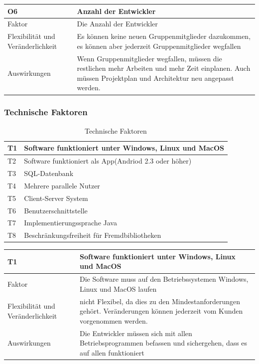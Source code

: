 \documentclass[fontsize=12pt,paper=a4,twoside]{scrartcl}
\begin{document}
\begin{table}[H]
\begin{tabular}{|p{3cm}|p{12cm}|}\hline
O6 & Anzahl der Entwickler\\ \hline
Faktor & Die Anzahl der Entwickler\\ \hline
Flexibilität und Veränderlichkeit & Es können keine neuen Gruppenmitglieder dazukommen, es können aber jederzeit Gruppenmitglieder wegfallen \\ \hline
Auswirkungen & Wenn Gruppenmitglieder wegfallen, müssen die restlichen mehr Arbeiten und mehr Zeit einplanen. Auch müssen Projektplan und Architektur neu angepasst werden.\\ \hline
\end{tabular}
\end{table}

\subsubsection{Technische Faktoren}
\label{sec:techfaktoren}

\begin{table}[H]
\centering
\caption{Technische Faktoren}
\begin{tabular}{|l|l|} \hline
T1 & Software funktioniert unter Windows, Linux und MacOS \\ \hline
T2 & Software funktioniert als App(Andriod 2.3 oder höher) \\ \hline
T3 & SQL-Datenbank \\ \hline
T4 & Mehrere parallele Nutzer \\ \hline
T5 & Client-Server System \\ \hline
T6 & Benutzerschnittstelle \\ \hline
T7 & Implementierungssprache Java \\ \hline
T8 &  Beschränkungsfreiheit für Fremdbibliotheken\\ \hline
\end{tabular}
\end{table}

\begin{table}[H]
\begin{tabular}{|p{3cm}|p{12cm}|}\hline
T1 & Software funktioniert unter Windows, Linux und MacOS \\ \hline
Faktor & Die Software muss auf den Betriebssystemen Windows, Linux und MacOS laufen\\ \hline
Flexibilität und Veränderlichkeit & nicht Flexibel, da dies zu den Mindestanforderungen gehört. Veränderungen können jederzeit vom Kunden vorgenommen werden.  \\ \hline
Auswirkungen & Die Entwickler müssen sich mit allen Betriebsprogrammen befassen und sichergehen, dass es auf allen funktioniert\\ \hline
\end{tabular}
\end{table}
\end{document}
